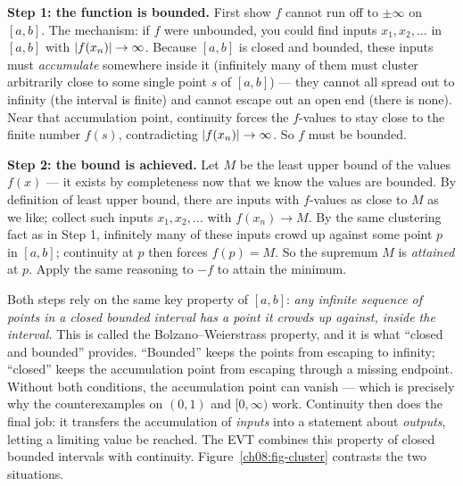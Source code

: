 \begin{intuitionbox}
\textbf{Step 1: the function is bounded.} First show $f$ cannot run off to $\pm\infty$ on
$[a,b]$. The mechanism: if $f$ were unbounded, you could find inputs $x_1,x_2,\dots$ in
$[a,b]$ with $\lvert f(x_n)\rvert\to\infty$. Because $[a,b]$ is closed and bounded, these inputs
must \emph{accumulate} somewhere inside it (infinitely many of them must cluster
arbitrarily close to some single point $s$ of $[a,b]$) --- they cannot all spread out to infinity (the
interval is finite) and cannot escape out an open end (there is none). Near that
accumulation point, continuity forces the $f$-values to stay close to the finite number $f(s)$,
contradicting $\lvert f(x_n)\rvert\to\infty$. So $f$ must be bounded.

\textbf{Step 2: the bound is achieved.} Let $M$ be the least upper bound of the values
$f(x)$ --- it exists by completeness now that we know the values are bounded. By definition
of least upper bound, there are inputs with $f$-values as close to $M$ as we like; collect
such inputs $x_1,x_2,\dots$ with $f(x_n)\to M$. By the same clustering fact as in Step 1,
infinitely many of these inputs crowd up against some point $p$ in $[a,b]$; continuity at $p$ then forces
$f(p)=M$. So the supremum $M$ is \emph{attained} at $p$. Apply the same reasoning
to $-f$ to attain the minimum.
\end{intuitionbox}

\begin{happeningbox}
Both steps rely on the same key property of $[a,b]$: \emph{any infinite sequence
of points in a closed bounded interval has a point it crowds up against, inside the
interval.} This is called the Bolzano--Weierstrass property, and it is what ``closed and bounded''
provides. ``Bounded'' keeps the points from escaping to infinity; ``closed'' keeps
the accumulation point from escaping through a missing endpoint. Without both conditions,
the accumulation point can vanish --- which is precisely why the counterexamples on $(0,1)$
and $[0,\infty)$ work. Continuity then does the final job: it transfers the accumulation of
\emph{inputs} into a statement about \emph{outputs}, letting a limiting value be
reached. The EVT combines this property of closed bounded intervals with continuity.
Figure~\ref{ch08:fig-cluster} contrasts the two situations.
\end{happeningbox}


